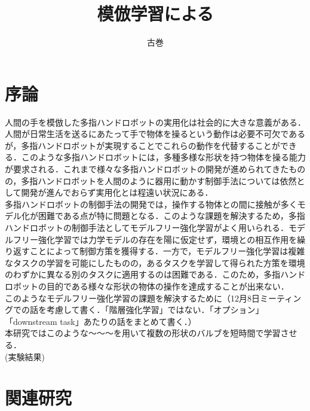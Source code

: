 \documentclass[dvipdfmx]{ampbt_nomag}
\title{模倣学習による
}     %
      {修士論文生成手法の検討}                             %
      {}                                             %
\author{古巻}{鉄平}             %
\begin{document}
\ifoutputbody
\makeinsidecover                %
\makeabstract                   %
\maketoc                        %
\setcounter{page}{1}            %
\section{序論}\label{sec-intro}		%
人間の手を模倣した多指ハンドロボットの実用化は社会的に大きな意義がある．人間が日常生活を送るにあたって手で物体を操るという動作は必要不可欠であるが，多指ハンドロボットが実現することでこれらの動作を代替することができる．このような多指ハンドロボットには，多種多様な形状を持つ物体を操る能力が要求される．これまで様々な多指ハンドロボットの開発が進められてきたものの，多指ハンドロボットを人間のように器用に動かす制御手法については依然として開発が進んでおらず実用化とは程遠い状況にある．\\
多指ハンドロボットの制御手法の開発では，操作する物体との間に接触が多くモデル化が困難である点が特に問題となる．このような課題を解決するため，多指ハンドロボットの制御手法としてモデルフリー強化学習がよく用いられる．モデルフリー強化学習では力学モデルの存在を陽に仮定せず，環境との相互作用を繰り返すことによって制御方策を獲得する\cite{RLBook}．一方で，モデルフリー強化学習は複雑なタスクの学習を可能にしたものの，あるタスクを学習して得られた方策を環境のわずかに異なる別のタスクに適用するのは困難である\cite{hua2021learning}．このため，多指ハンドロボットの目的である様々な形状の物体の操作を達成することが出来ない．\\
このようなモデルフリー強化学習の課題を解決するために（12月8日ミーティングでの話を考慮して書く．「階層強化学習」ではない．「オプション」「downstream task」あたりの話をまとめて書く．）
\\
本研究ではこのような〜〜〜を用いて複数の形状のバルブを短時間で学習させる．\\
(実験結果)\\


\section{関連研究}\label{sec-related_papers}
\end{document}
